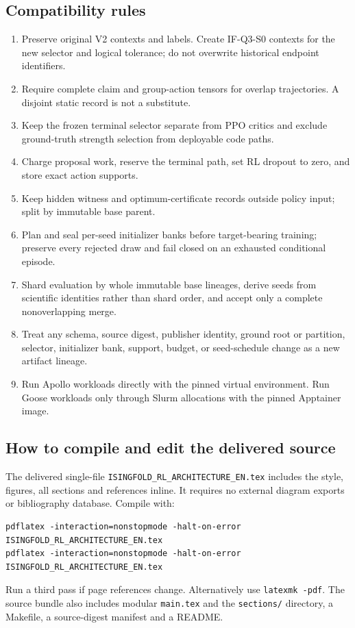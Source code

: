 \documentclass[11pt,a4paper]{article}
\newcommand{\code}[1]{\texttt{\small #1}}
\theoremstyle{definition}\newtheorem{definition}[proposition]{Definition}
\begin{document}
\subsection{Compatibility rules}
\begin{enumerate}
\item Preserve original V2 contexts and labels. Create IF-Q3-S0 contexts for the new selector and logical tolerance; do not overwrite historical endpoint identifiers.
\item Require complete claim and group-action tensors for overlap trajectories. A disjoint static record is not a substitute.
\item Keep the frozen terminal selector separate from PPO critics and exclude ground-truth strength selection from deployable code paths.
\item Charge proposal work, reserve the terminal path, set RL dropout to zero, and store exact action supports.
\item Keep hidden witness and optimum-certificate records outside policy input; split by immutable base parent.
\item Plan and seal per-seed initializer banks before target-bearing training; preserve every rejected draw and fail closed on an exhausted conditional episode.
\item Shard evaluation by whole immutable base lineages, derive seeds from scientific identities rather than shard order, and accept only a complete nonoverlapping merge.
\item Treat any schema, source digest, publisher identity, ground root or partition, selector, initializer bank, support, budget, or seed-schedule change as a new artifact lineage.
\item Run Apollo workloads directly with the pinned virtual environment. Run Goose workloads only through Slurm allocations with the pinned Apptainer image.
\end{enumerate}

\subsection{How to compile and edit the delivered source}
The delivered single-file \code{ISINGFOLD\_RL\_ARCHITECTURE\_EN.tex} includes the style, figures, all sections and references inline. It requires no external diagram exports or bibliography database. Compile with:
\begin{Verbatim}
pdflatex -interaction=nonstopmode -halt-on-error ISINGFOLD_RL_ARCHITECTURE_EN.tex
pdflatex -interaction=nonstopmode -halt-on-error ISINGFOLD_RL_ARCHITECTURE_EN.tex
\end{Verbatim}
Run a third pass if page references change. Alternatively use \code{latexmk -pdf}. The source bundle also includes modular \code{main.tex} and the \code{sections/} directory, a Makefile, a source-digest manifest and a README.
\end{document}
